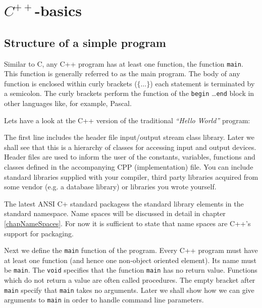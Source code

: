\chapter{$C^{++}$-basics \label{chapBasicCPP}}



\section{Structure of a simple program}

Similar to C, any C++ program has at least one function, the function
\verb+main+. This function is generally referred to as the main program.
The body of any function is enclosed within curly brackets ($\{ \dots \}$)
each statement is terminated by a semicolon.
The curly brackets perform the function of the \verb+begin+ \dots \verb+end+
block in other languages like, for example, Pascal.

Lets have a look at the C++ version of the traditional {\it ``Hello World''} program:

\noindent {\small }

\noindent
The first line includes the header file input/output stream class library. Later we
shall see that this is a hierarchy of classes for accessing input and output devices.
Header files are used to inform the user of the constants, variables, functions and
classes defined in the accompanying CPP (implementation) file. You can include
standard libraries supplied with your compiler, third party libraries acquired
from some vendor (e.g. a database library) or libraries you wrote yourself.

The latest ANSI  C+ standard packagess the standard library elements in the
standard namespace. Name spaces will be discussed in detail in chapter
\ref{chapNameSpaces}. For now it is sufficient to  state that name spaces
are C++'s support for packaging.

Next we define the \verb+main+ function of the program. Every C++ program
must have at least one function (and hence one non-object oriented element).
Its name must be \verb+main+. The \verb+void+ specifies that the function \verb+main+
has no return value. Functions which do not return a value are often called procedures.
The empty bracket after \verb+main+ specify that \verb+main+
takes no arguments. Later we shall show how we can give arguments to \verb+main+
in order to handle command line parameters.

